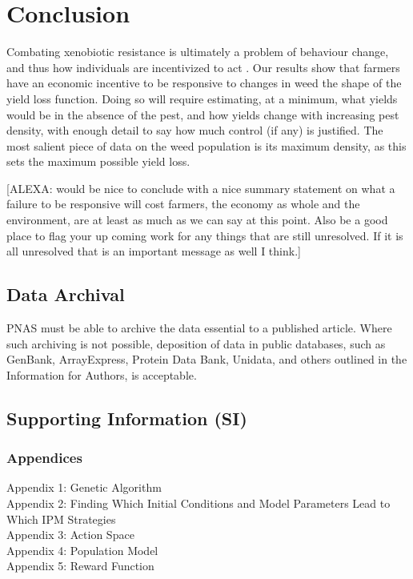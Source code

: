 \documentclass[12pt, a4paper]{article}
\begin{document}
\section*{Conclusion}
Combating xenobiotic resistance is ultimately a problem of behaviour change, and thus how individuals are incentivized to act \citep{Hurl2016}. Our results show that farmers have an economic incentive to be responsive to changes in weed the shape of the yield loss function. Doing so will require estimating, at a minimum, what yields would be in the absence of the pest, and how yields change with increasing pest density, with enough detail to say how much control (if any) is justified. The most salient piece of data on the weed population is its maximum density, as this sets the maximum possible yield loss.      

[ALEXA: would be nice to conclude with a nice summary statement on what a failure to be responsive will cost farmers, the economy as whole and the environment, are at least as much as we can say at this point. Also be a good place to flag your up coming work for any things that are still unresolved. If it is all unresolved that is an important message as well I think.] 

\subsection*{Data Archival}

PNAS must be able to archive the data essential to a published article. Where such archiving is not possible, deposition of data in public databases, such as GenBank, ArrayExpress, Protein Data Bank, Unidata, and others outlined in the Information for Authors, is acceptable.

\subsection*{Supporting Information (SI)}
\subsubsection*{Appendices}
Appendix 1: Genetic Algorithm\\
Appendix 2: Finding Which Initial Conditions and Model Parameters Lead to Which IPM Strategies\\
Appendix 3: Action Space\\
Appendix 4: Population Model\\
Appendix 5: Reward Function\\
\end{document}
